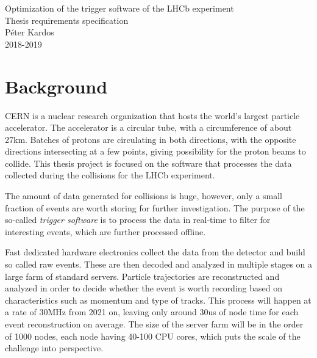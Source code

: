 \documentclass[12pt]{article}
\begin{document}
	
	
	\begin{center}
		\Huge Optimization of the trigger software of the LHCb experiment\\		
		\Large Thesis requirements specification\\
		\vspace{1pc}
		\huge Péter Kardos \\
		\large 2018-2019
	\end{center}
	
	
	\section{Background}
	
	
	CERN\cite{cern_about} is a nuclear research organization that hosts the world's largest particle accelerator\cite{lhc_desc}. The accelerator is a circular tube, with a circumference of about 27km. Batches of protons are circulating in both directions, with the opposite directions intersecting at a few points, giving possibility for the proton beams to collide. This thesis project is focused on the software that processes the data collected during the collisions for the LHCb\cite{lchb_desc} experiment.
	
	\vspace{0.7pc}
	The amount of data generated for collisions is huge, however, only a small fraction of events are worth storing for further investigation. The purpose of the so-called \textit{trigger software} is to process the data in real-time to filter for interesting events, which are further processed offline.
	
	\vspace{0.7pc}
	Fast dedicated hardware electronics collect the data from the detector and build so called raw events. These are then decoded and analyzed in multiple stages on a large farm of standard servers. Particle trajectories are reconstructed and analyzed in order to decide whether the event is worth recording based on characteristics such as momentum and type of tracks. This process will happen at a rate of 30MHz from 2021 on, leaving only around 30us of node time for each event reconstruction on average. The size of the server farm will be in the order of 1000 nodes, each node having 40-100 CPU cores, which puts the scale of the challenge into perspective.
		
\end{document}

